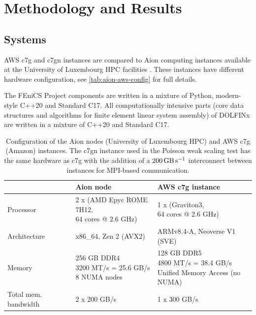 \section*{Methodology and Results}

\subsection*{Systems}
AWS c7g and c7gn instances are compared to Aion computing instances available
at the University of Luxembourg HPC facilities \citep{VCPKVO_HPCCT22}. These
instances have different hardware configuration, see
\autoref{tab:aion-aws-config} for full details.

The FEniCS Project components are written in a mixture of Python, modern-style
C++20 and Standard C17. All computationally intensive parts (core data
structures and algorithms for finite element linear system assembly) of DOLFINx
are written in a mixture of C++20 and Standard C17.

\begin{table}
  \footnotesize
  \renewcommand{\arraystretch}{1.5}
  \begin{tabular}{l|l|l}
                              & Aion node                                                          & AWS c7g instance \\ \hline \hline
    Processor                 & \makecell[l]{2 x (AMD Epyc ROME 7H12, \\ 64 cores @ 2.6 GHz)}      & \makecell[l]{1 x (Graviton3, \\ 64 cores @ 2.6 GHz)} \\ \hline
    Architecture              & x86\_64, Zen 2 (AVX2)                                              & ARMv8.4-A, Neoverse V1 (SVE) \\ \hline
    Memory                    & \makecell[l]{256 GB DDR4 \\ 3200 MT/s = 25.6 GB/s \\ 8 NUMA nodes} & \makecell[l]{128 GB DDR5 \\ 4800 MT/s = 38.4 GB/s  \\ Unified Memory Access (no NUMA) } \\ \hline
    Total mem. bandwidth      & 2 x 200 GB/s                                                       & 1 x 300 GB/s  \\ \hline
  \end{tabular}
  \vspace{5pt}
  \caption{Configuration of the Aion nodes (University of Luxembourg HPC) and
	AWS c7g (Amazon) instances. The c7gn instance used in the Poisson weak
	scaling test has the same hardware as c7g with the addition of a
	$\SI{200}{\giga\byte\per\second}$ interconnect between instances for
	MPI-based communication.}
  \label{tab:aion-aws-config}
\end{table}


